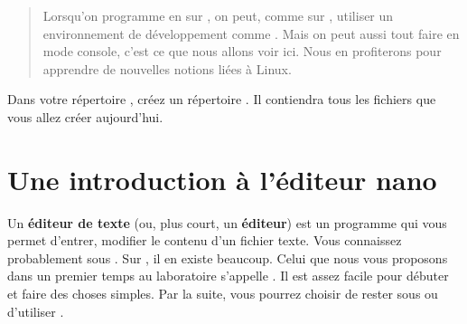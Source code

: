 \documentclass[a4paper,11pt]{style-esi/td}
\begin{document}
\entete
\titre
{}
\lastedit

\bigskip
\begin{abstract}
    Lorsqu'on programme en  sur ,
    on peut, comme sur ,
    utiliser un environnement de développement comme .
    Mais on peut aussi tout faire en mode console, 
    c'est ce que nous allons voir ici.
    Nous en profiterons pour apprendre de nouvelles notions liées à Linux.
\end{abstract}

\bigskip
\tableofcontents

\vfill
\begin{infobox}
    Dans votre répertoire , 
    créez un répertoire . 
    Il contiendra tous les fichiers que vous allez créer aujourd'hui. 
\end{infobox}
\vfill

\newpage

\section{Une introduction à l'éditeur nano}

	Un \textbf{éditeur de texte} (ou, plus court, un \textbf{éditeur}) 
	est un programme qui vous permet d'entrer, modifier
	le contenu d'un fichier texte. 
	Vous connaissez probablement  sous . 
	Sur , il en existe beaucoup. 
	Celui que nous vous proposons dans un premier temps au laboratoire 
	s'appelle . 
	Il est assez facile pour débuter et faire des choses simples. 
	Par la suite, vous pourrez choisir de rester sous  
	ou d'utiliser .
\end{document}
